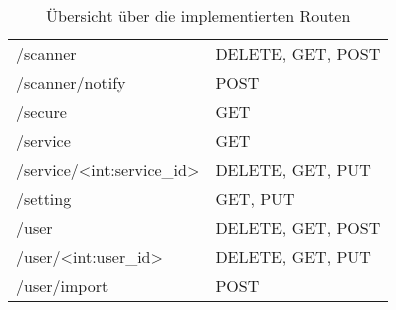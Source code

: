 \begin{table}
\begin{tabular}{l l}
		/scanner								 & DELETE, GET, POST \\
		/scanner/notify							 & POST \\
		/secure									 & GET \\
		/service								 & GET \\
		/service/<int:service\_id>				 & DELETE, GET, PUT \\
		/setting								 & GET, PUT \\
		/user									 & DELETE, GET, POST \\
		/user/<int:user\_id>					 & DELETE, GET, PUT \\
		/user/import							 & POST \\
	\end{tabular}
	\caption{Übersicht über die implementierten Routen}
	\label{table:gis-routes}
\end{table}
